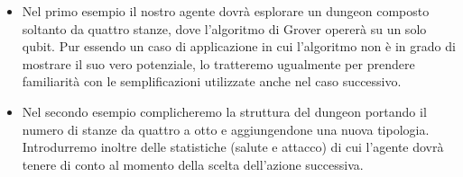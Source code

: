 \documentclass{book}
\theoremstyle{definition}
\theoremstyle{definition}
\theoremstyle{definition}
\theoremstyle{plain}
\theoremstyle{plain}
\theoremstyle{plain}
\theoremstyle{plain}
\begin{document}
\begin{itemize}
    \item Nel primo esempio il nostro agente dovrà esplorare un dungeon composto soltanto da quattro stanze, dove l'algoritmo di Grover opererà su un solo qubit. Pur essendo un caso di applicazione in cui l'algoritmo non è in grado di mostrare il suo vero potenziale, lo tratteremo ugualmente per prendere familiarità con le semplificazioni utilizzate anche nel caso successivo.
    \item Nel secondo esempio complicheremo la struttura del dungeon portando il numero di stanze da quattro a otto e aggiungendone una nuova tipologia. Introdurremo inoltre delle statistiche (salute e attacco) di cui l'agente dovrà tenere di conto al momento della scelta dell'azione successiva.
\end{itemize}
\end{document}
